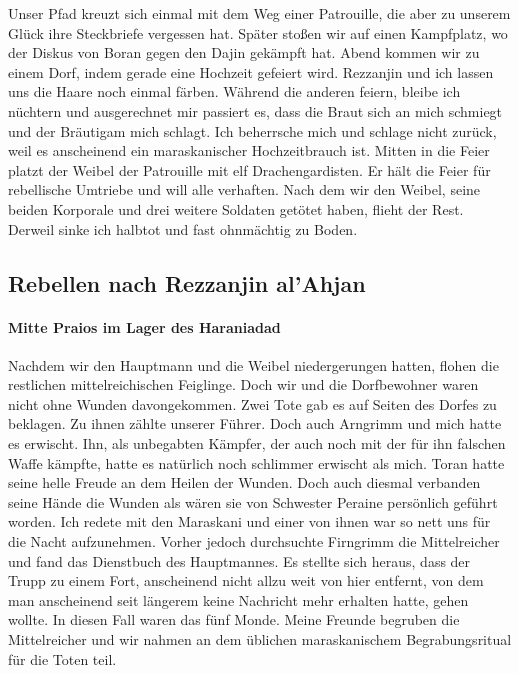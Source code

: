 Unser Pfad kreuzt sich einmal mit dem Weg einer Patrouille, die aber zu unserem Glück ihre Steckbriefe vergessen hat. Später stoßen wir auf einen Kampfplatz, wo der Diskus von Boran gegen den Dajin gekämpft hat. Abend kommen wir zu einem Dorf, indem gerade eine Hochzeit gefeiert wird. Rezzanjin und ich lassen uns die Haare noch einmal färben. Während die anderen feiern, bleibe ich nüchtern und ausgerechnet mir passiert es, dass die Braut sich an mich schmiegt und der Bräutigam mich schlagt. Ich beherrsche mich und schlage nicht zurück, weil es anscheinend ein maraskanischer Hochzeitbrauch ist. Mitten in die Feier platzt der Weibel der Patrouille mit elf Drachengardisten. Er hält die Feier für rebellische Umtriebe und will alle verhaften. Nach dem wir den Weibel, seine beiden Korporale und drei weitere Soldaten getötet haben, flieht der Rest. Derweil sinke ich halbtot und fast ohnmächtig zu Boden.

\subsection{Rebellen nach Rezzanjin al'Ahjan}

\paragraph{Mitte Praios im Lager des Haraniadad}
Nachdem wir den Hauptmann und die Weibel niedergerungen hatten, flohen die restlichen mittelreichischen Feiglinge. Doch wir und die Dorfbewohner waren nicht ohne Wunden davongekommen. Zwei Tote gab es auf Seiten des Dorfes zu beklagen. Zu ihnen zählte unserer Führer. Doch auch Arngrimm und mich hatte es erwischt. Ihn, als unbegabten Kämpfer, der auch noch mit der für ihn falschen Waffe kämpfte, hatte es natürlich noch schlimmer erwischt als mich. Toran hatte seine helle Freude an dem Heilen der Wunden. Doch auch diesmal verbanden seine Hände die Wunden als wären sie von Schwester Peraine persönlich geführt worden. Ich redete mit den Maraskani und einer von ihnen war so nett uns für die Nacht aufzunehmen. Vorher jedoch durchsuchte Firngrimm die Mittelreicher und fand das Dienstbuch des Hauptmannes. Es stellte sich heraus, dass der Trupp zu einem Fort, anscheinend nicht allzu weit von hier entfernt, von dem man anscheinend seit längerem keine Nachricht mehr erhalten hatte, gehen wollte. In diesen Fall waren das fünf Monde. Meine Freunde begruben die Mittelreicher und wir nahmen an dem üblichen maraskanischem Begrabungsritual für die Toten teil.

